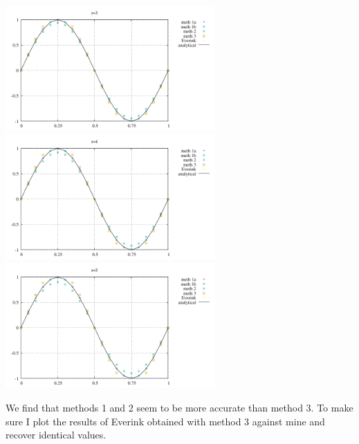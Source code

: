 \begin{center}
\includegraphics[width=8cm]{python_codes/fieldstone_164/results1/u_5.pdf}\\
\includegraphics[width=8cm]{python_codes/fieldstone_164/results1/u_6.pdf}
\includegraphics[width=8cm]{python_codes/fieldstone_164/results1/u_7.pdf}
\end{center}
We find that methods 1 and 2 seem to be more accurate than method 3.
To make sure I plot the results of Everink obtained with method 3 against mine 
and recover identical values.

